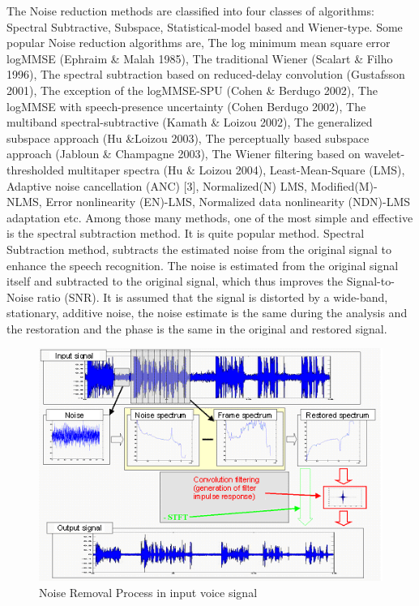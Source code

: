 \begin{enumerate}
	The Noise reduction methods are classified into four classes of algorithms: Spectral Subtractive, Subspace, Statistical-model based and Wiener-type. Some popular Noise reduction algorithms are, The log minimum mean square error logMMSE (Ephraim \& Malah 1985), The traditional Wiener (Scalart \& Filho 1996), The spectral subtraction based on reduced-delay convolution (Gustafsson 2001), The exception of the logMMSE-SPU (Cohen \& Berdugo 2002), The logMMSE with speech-presence uncertainty (Cohen Berdugo 2002), The multiband spectral-subtractive (Kamath \& Loizou 2002), The generalized subspace approach (Hu \&Loizou 2003), The perceptually based subspace approach (Jabloun \& Champagne 2003), The Wiener filtering based on wavelet-thresholded multitaper spectra (Hu \& Loizou 2004), Least-Mean-Square (LMS), Adaptive noise cancellation (ANC) [3], Normalized(N) LMS, Modified(M)- NLMS, Error nonlinearity (EN)-LMS, Normalized data nonlinearity (NDN)-LMS adaptation etc. 
	Among those many methods, one of the most simple and effective is the spectral subtraction method. It is quite popular method. Spectral Subtraction method, subtracts the estimated noise from the original signal to enhance the speech recognition. The noise is estimated from the original signal itself and subtracted to the original signal, which thus improves the Signal-to-Noise ratio (SNR). It is assumed that the signal is distorted by a wide-band, stationary, additive noise, the noise estimate is the same during the analysis and the restoration and the phase is the same in the original and restored signal.
	\begin{figure}[h]
		\begin{center}
			\includegraphics[scale=0.8]{images/image_2.png}
			\caption{Noise Removal Process in input voice signal}
		\end{center}
	\end{figure}
	
\end{enumerate}
